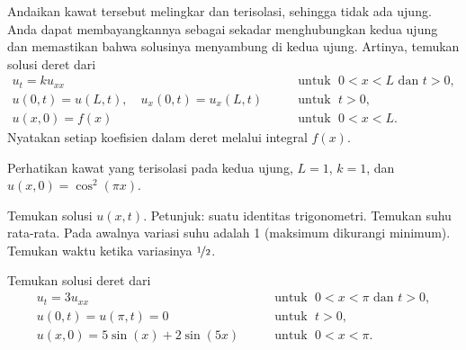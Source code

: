 \begin{exercise}[menantang]
Andaikan kawat tersebut melingkar dan terisolasi, sehingga tidak ada ujung. 
Anda dapat membayangkannya sebagai sekadar menghubungkan kedua ujung dan 
memastikan bahwa solusinya menyambung di kedua ujung.
Artinya, temukan solusi deret dari
\begin{equation*}
\begin{array}{ll}
u_t = k u_{xx} & \qquad \text{untuk } \; 0 < x < L \text{ dan } t > 0, \\
u(0,t) = u(L,t) , \quad
u_x(0,t) = u_x(L,t)  & \qquad \text{untuk } \; t > 0, \\
u(x,0) = f(x) & \qquad \text{untuk } \; 0 < x < L .
\end{array}
\end{equation*}
Nyatakan setiap koefisien dalam deret melalui integral $f(x)$.
\end{exercise}

\begin{exercise}
Perhatikan kawat yang terisolasi pada kedua ujung, $L=1$, $k=1$,
dan $u(x,0) = \cos^2(\pi x)$.
\begin{tasks}
\task
Temukan solusi $u(x,t)$.  Petunjuk: suatu identitas trigonometri.
\task
Temukan suhu rata-rata.
\task
Pada awalnya variasi suhu adalah 1 (maksimum dikurangi minimum).
Temukan waktu ketika variasinya $\nicefrac{1}{2}$.
\end{tasks}
\end{exercise}

\setcounter{exercise}{100}


\begin{exercise}
Temukan solusi deret dari
\begin{equation*}
\begin{array}{ll}
u_t =  3 u_{xx} & \qquad \text{untuk } \; 0 < x < \pi \text{ dan } t > 0, \\
u(0,t) = u(\pi,t) = 0 & \qquad \text{untuk } \; t > 0, \\
u(x,0) = 5\sin (x) + 2\sin (5x) & \qquad \text{untuk } \; 0 < x < \pi .
\end{array}
\end{equation*}
\end{exercise}


